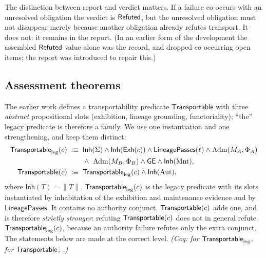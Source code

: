 The distinction between report and verdict matters. If a failure co-occurs with an unresolved obligation the verdict is $\mathsf{Refuted}$, but the unresolved obligation must not disappear merely because another obligation already refutes transport. It does not: it remains in the report. (In an earlier form of the development the assembled $\mathsf{Refuted}$ value alone was the record, and dropped co-occurring open items; the report was introduced to repair this.)

\subsection{Assessment theorems}
The earlier work defines a transportability predicate $\mathsf{Transportable}$ with three \emph{abstract} propositional slots (exhibition, lineage grounding, functoriality); ``the'' legacy predicate is therefore a family. We use one instantiation and one strengthening, and keep them distinct:
\begin{align*}
\mathsf{Transportable}_{\mathrm{leg}}(c) \;:\equiv\;{} & \mathsf{Inh}(\Sigma) \wedge \mathsf{Inh}(\mathsf{Exh}(c)) \wedge \mathsf{LineagePasses}(\ell) \wedge \mathrm{Adm}(M_A,\Phi_A)\\
& \wedge\ \mathrm{Adm}(M_B,\Phi_B) \wedge \mathsf{GE} \wedge \mathsf{Inh}(\mathrm{Mnt}),\\
\mathsf{Transportable}(c) \;:\equiv\;{} & \mathsf{Transportable}_{\mathrm{leg}}(c) \wedge \mathsf{Inh}(\mathrm{Aut}),
\end{align*}
where $\mathsf{Inh}(T) = \|T\|$. $\mathsf{Transportable}_{\mathrm{leg}}(c)$ is the legacy predicate with its slots instantiated by inhabitation of the exhibition and maintenance evidence and by $\mathsf{LineagePasses}$. It contains no authority conjunct. $\mathsf{Transportable}(c)$ adds one, and is therefore \emph{strictly stronger}: refuting $\mathsf{Transportable}(c)$ does not in general refute $\mathsf{Transportable}_{\mathrm{leg}}(c)$, because an authority failure refutes only the extra conjunct. The statements below are made at the correct level. \emph{(Coq:  for $\mathsf{Transportable}_{\mathrm{leg}}$,  for $\mathsf{Transportable}$; .)}

